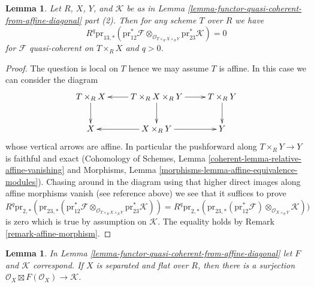 \documentclass{stacks-project}
\theoremstyle{plain}
\newtheorem{lemma}[subsection]{Lemma}
\theoremstyle{definition}
\theoremstyle{remark}
\numberwithin{equation}{subsection}
\begin{document}
\begin{lemma}
\label{lemma-persistence-exactness}
Let $R$, $X$, $Y$, and $\mathcal{K}$ be as in
Lemma \ref{lemma-functor-quasi-coherent-from-affine-diagonal} part (2).
Then for any scheme $T$ over $R$ we have
$$
R^q\text{pr}_{13, *}(\text{pr}_{12}^*\mathcal{F}
\otimes_{\mathcal{O}_{T \times_R X \times_R Y}}
\text{pr}_{23}^*\mathcal{K}) = 0
$$
for $\mathcal{F}$ quasi-coherent on $T \times_R X$ and $q > 0$.
\end{lemma}

\begin{proof}
The question is local on $T$ hence we may assume $T$ is affine.
In this case we can consider the diagram
$$
\xymatrix{
T \times_R X \ar[d] &
T \times_R X \times_R Y \ar[d] \ar[l] \ar[r] &
T \times_R Y \ar[d] \\
X &
X \times_R Y \ar[l] \ar[r] &
Y
}
$$
whose vertical arrows are affine. In particular the pushforward along
$T \times_R Y \to Y$ is faithful and exact (Cohomology of Schemes,
Lemma \ref{coherent-lemma-relative-affine-vanishing} and
Morphisms, Lemma \ref{morphisms-lemma-affine-equivalence-modules}).
Chasing around in the diagram using that higher direct images along
affine morphisms vanish (see reference above) we see that
it suffices to prove
$$
R^q\text{pr}_{2, *}(
\text{pr}_{23, *}(\text{pr}_{12}^*\mathcal{F}
\otimes_{\mathcal{O}_{T \times_R X \times_R Y}}
\text{pr}_{23}^*\mathcal{K})) =
R^q\text{pr}_{2, *}(
\text{pr}_{23, *}(\text{pr}_{12}^*\mathcal{F})
\otimes_{\mathcal{O}_{X \times_R Y}}
\mathcal{K}))
$$
is zero which is true by assumption on $\mathcal{K}$.
The equality holds by Remark \ref{remark-affine-morphism}.
\end{proof}

\begin{lemma}
\label{lemma-functor-quasi-coherent-from-separated}
In Lemma \ref{lemma-functor-quasi-coherent-from-affine-diagonal}
let $F$ and $\mathcal{K}$ correspond. If $X$ is separated and
flat over $R$, then there is a surjection
$\mathcal{O}_X \boxtimes F(\mathcal{O}_X) \to \mathcal{K}$.
\end{lemma}
\end{document}
